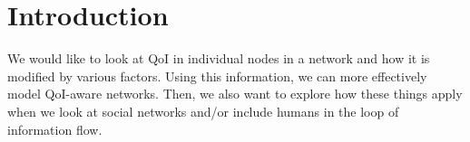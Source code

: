 \section{Introduction}
\label{sec:intro}

We would like to look at QoI in individual nodes in a network and how it is modified by various factors.  Using this information, we can more effectively model QoI-aware networks.  Then, we also want to explore how these things apply when we look at social networks and/or include humans in the loop of information flow.


